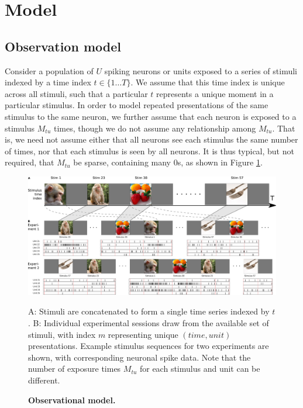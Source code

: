 \documentclass[10pt,letterpaper]{article}
\begin{document}
\section*{Model}
\label{model_sec}

\subsection*{Observation model}
Consider a population of $U$ spiking neurons or units exposed to a series of stimuli indexed by a time index $t\in \lbrace 1\ldots T\rbrace$. We assume that this time index is unique across all stimuli, such that a particular $t$ represents a unique moment in a particular stimulus. In order to model repeated presentations of the same stimulus to the same neuron, we further assume that each neuron is exposed to a stimulus $M_{tu}$ times, though we do not assume any relationship among $M_{tu}$. That is, we need not assume either that all neurons see each stimulus the same number of times, nor that each stimulus is seen by all neurons. It is thus typical, but not required, that $M_{tu}$ be sparse, containing many 0s, as shown in Figure \ref{fig:movie}.

\begin{figure}[!h]
    \includegraphics[width=\linewidth]{figures/stim_movie}
	\caption{\bf Observational model.}
    A: Stimuli are concatenated to form a single time series indexed by $t$. B: Individual experimental sessions draw from the available set of stimuli, with index $m$ representing unique $(time, unit)$ presentations. Example stimulus sequences for two experiments are shown, with corresponding neuronal spike data. Note that the number of exposure times $M_{tu}$ for each stimulus and unit can be different.
	\label{fig:movie}
\end{figure}
\end{document}
